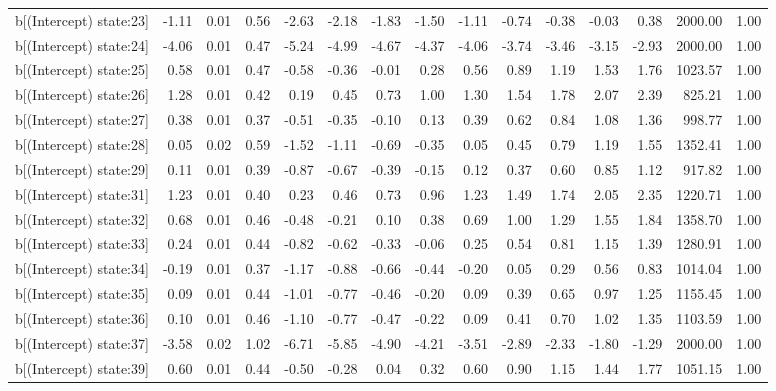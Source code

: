 \begin{table}[ht]
\begin{tabular}{rrrrrrrrrrrrrrr}
  b[(Intercept) state:23] & -1.11 & 0.01 & 0.56 & -2.63 & -2.18 & -1.83 & -1.50 & -1.11 & -0.74 & -0.38 & -0.03 & 0.38 & 2000.00 & 1.00 \\ 
  b[(Intercept) state:24] & -4.06 & 0.01 & 0.47 & -5.24 & -4.99 & -4.67 & -4.37 & -4.06 & -3.74 & -3.46 & -3.15 & -2.93 & 2000.00 & 1.00 \\ 
  b[(Intercept) state:25] & 0.58 & 0.01 & 0.47 & -0.58 & -0.36 & -0.01 & 0.28 & 0.56 & 0.89 & 1.19 & 1.53 & 1.76 & 1023.57 & 1.00 \\ 
  b[(Intercept) state:26] & 1.28 & 0.01 & 0.42 & 0.19 & 0.45 & 0.73 & 1.00 & 1.30 & 1.54 & 1.78 & 2.07 & 2.39 & 825.21 & 1.00 \\ 
  b[(Intercept) state:27] & 0.38 & 0.01 & 0.37 & -0.51 & -0.35 & -0.10 & 0.13 & 0.39 & 0.62 & 0.84 & 1.08 & 1.36 & 998.77 & 1.00 \\ 
  b[(Intercept) state:28] & 0.05 & 0.02 & 0.59 & -1.52 & -1.11 & -0.69 & -0.35 & 0.05 & 0.45 & 0.79 & 1.19 & 1.55 & 1352.41 & 1.00 \\ 
  b[(Intercept) state:29] & 0.11 & 0.01 & 0.39 & -0.87 & -0.67 & -0.39 & -0.15 & 0.12 & 0.37 & 0.60 & 0.85 & 1.12 & 917.82 & 1.00 \\ 
  b[(Intercept) state:31] & 1.23 & 0.01 & 0.40 & 0.23 & 0.46 & 0.73 & 0.96 & 1.23 & 1.49 & 1.74 & 2.05 & 2.35 & 1220.71 & 1.00 \\ 
  b[(Intercept) state:32] & 0.68 & 0.01 & 0.46 & -0.48 & -0.21 & 0.10 & 0.38 & 0.69 & 1.00 & 1.29 & 1.55 & 1.84 & 1358.70 & 1.00 \\ 
  b[(Intercept) state:33] & 0.24 & 0.01 & 0.44 & -0.82 & -0.62 & -0.33 & -0.06 & 0.25 & 0.54 & 0.81 & 1.15 & 1.39 & 1280.91 & 1.00 \\ 
  b[(Intercept) state:34] & -0.19 & 0.01 & 0.37 & -1.17 & -0.88 & -0.66 & -0.44 & -0.20 & 0.05 & 0.29 & 0.56 & 0.83 & 1014.04 & 1.00 \\ 
  b[(Intercept) state:35] & 0.09 & 0.01 & 0.44 & -1.01 & -0.77 & -0.46 & -0.20 & 0.09 & 0.39 & 0.65 & 0.97 & 1.25 & 1155.45 & 1.00 \\ 
  b[(Intercept) state:36] & 0.10 & 0.01 & 0.46 & -1.10 & -0.77 & -0.47 & -0.22 & 0.09 & 0.41 & 0.70 & 1.02 & 1.35 & 1103.59 & 1.00 \\ 
  b[(Intercept) state:37] & -3.58 & 0.02 & 1.02 & -6.71 & -5.85 & -4.90 & -4.21 & -3.51 & -2.89 & -2.33 & -1.80 & -1.29 & 2000.00 & 1.00 \\ 
  b[(Intercept) state:39] & 0.60 & 0.01 & 0.44 & -0.50 & -0.28 & 0.04 & 0.32 & 0.60 & 0.90 & 1.15 & 1.44 & 1.77 & 1051.15 & 1.00 \\ 

\end{tabular}
\end{table}
